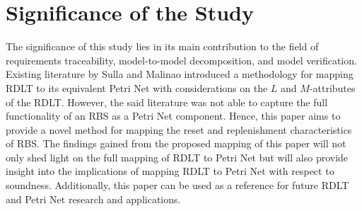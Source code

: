 \section{Significance of the Study}
The significance of this study lies in its main contribution to the field of requirements traceability, model-to-model decomposition, and model verification. Existing literature by Sulla and Malinao \cite{sulla-malinao} introduced a methodology for mapping RDLT to its equivalent Petri Net with considerations on the $L$ and $M$-attributes of the RDLT. However, the said literature was not able to capture the full functionality of an RBS as a Petri Net component. Hence, this paper aims to provide a novel method for mapping the reset and replenishment characteristics of RBS. The findings gained from the proposed mapping of this paper will not only shed light on the full mapping of RDLT to Petri Net but will also provide insight into the implications of mapping RDLT to Petri Net with respect to soundness. Additionally, this paper can be used as a reference for future RDLT and Petri Net research and applications.